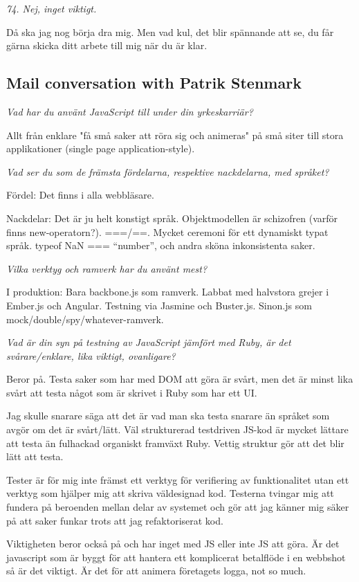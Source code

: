 \documentclass[11pt]{article}
\begin{document}
\emph{74. Nej, inget viktigt.}

Då ska jag nog börja dra mig. Men vad kul, det blir spännande att se, du får gärna skicka ditt arbete till mig när du är klar.

\subsection*{Mail conversation with Patrik Stenmark}

\emph{Vad har du använt JavaScript till under din yrkeskarriär?}

Allt från enklare "få små saker att röra sig och animeras" på små siter
till stora applikationer (single page application-style).

\emph{Vad ser du som de främsta fördelarna, respektive nackdelarna, med språket?}

Fördel: Det finns i alla webbläsare.

Nackdelar: Det är ju helt konstigt språk. Objektmodellen är schizofren
(varför finns new-operatorn?). ===/==. Mycket ceremoni för ett dynamiskt
typat språk. typeof NaN === ``number'', och andra sköna inkonsistenta saker.

\emph{Vilka verktyg och ramverk har du använt mest?}

I produktion: Bara backbone.js som ramverk. Labbat med halvstora grejer i
Ember.js och Angular. Testning via Jasmine och Buster.js. Sinon.js som
mock/double/spy/whatever-ramverk.

\emph{Vad är din syn på testning av JavaScript jämfört med Ruby, är det
svårare/enklare, lika viktigt, ovanligare?}

Beror på. Testa saker som har med DOM att göra är svårt, men det är minst
lika svårt att testa något som är skrivet i Ruby som har ett UI.

Jag skulle snarare säga att det är vad man ska testa snarare än språket
som avgör om det är svårt/lätt. Väl strukturerad testdriven JS-kod är
mycket lättare att testa än fulhackad organiskt framväxt Ruby. Vettig
struktur gör att det blir lätt att testa.

Tester är för mig inte främst ett verktyg för verifiering av
funktionalitet utan ett verktyg som hjälper mig att skriva väldesignad
kod. Testerna tvingar mig att fundera på beroenden mellan delar av
systemet och gör att jag känner mig säker på att saker funkar trots att
jag refaktoriserat kod.

Viktigheten beror också på och har inget med JS eller inte JS att göra. Är
det javascript som är byggt för att hantera ett komplicerat betalflöde i
en webbshot så är det viktigt. Är det för att animera företagets logga,
not so much.
\end{document}
